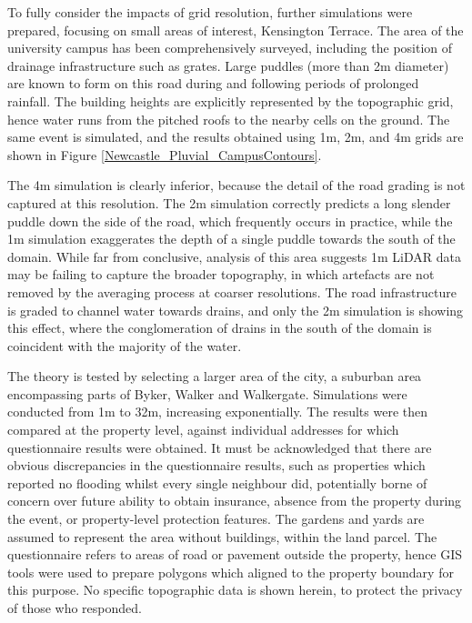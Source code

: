 To fully consider the impacts of grid resolution, further simulations were prepared, focusing on small areas of interest, Kensington Terrace. The area of the university campus has been comprehensively surveyed, including the position of drainage infrastructure such as grates. Large puddles (more than 2m diameter) are known to form on this road during and following periods of prolonged rainfall. The building heights are explicitly represented by the topographic grid, hence water runs from the pitched roofs to the nearby cells on the ground. The same event is simulated, and the results obtained using 1m, 2m, and 4m grids are shown in Figure \ref{Newcastle_Pluvial_CampusContours}.

The 4m simulation is clearly inferior, because the detail of the road grading is not captured at this resolution. The 2m simulation correctly predicts a long slender puddle down the side of the road, which frequently occurs in practice, while the 1m simulation exaggerates the depth of a single puddle towards the south of the domain. While far from conclusive, analysis of this area suggests 1m LiDAR data may be failing to capture the broader topography, in which artefacts are not removed by the averaging process at coarser resolutions. The road infrastructure is graded to channel water towards drains, and only the 2m simulation is showing this effect, where the conglomeration of drains in the south of the domain is coincident with the majority of the water.

The theory is tested by selecting a larger area of the city, a suburban area encompassing parts of Byker, Walker and Walkergate. Simulations were conducted from 1m to 32m, increasing exponentially. The results were then compared at the property level, against individual addresses for which questionnaire results were obtained. It must be acknowledged that there are obvious discrepancies in the questionnaire results, such as properties which reported no flooding whilst every single neighbour did, potentially borne of concern over future ability to obtain insurance, absence from the property during the event, or property-level protection features. The gardens and yards are assumed to represent the area without buildings, within the land parcel. The questionnaire refers to areas of road or pavement outside the property, hence GIS tools were used to prepare polygons which aligned to the property boundary for this purpose. No specific topographic data is shown herein, to protect the privacy of those who responded. 


